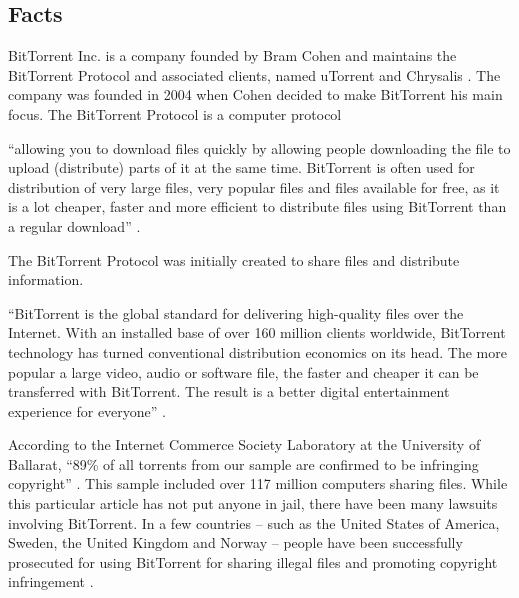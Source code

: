 \documentclass[11pt]{article}
\begin{document}
\begin{multicols}{2}

\setcounter{page}{1}


\section{Facts}
BitTorrent Inc. is a company founded by Bram Cohen and maintains the BitTorrent Protocol and associated clients, named uTorrent and Chrysalis \cite{btabout}. The company was founded in 2004 when Cohen decided to make BitTorrent his main focus. The BitTorrent Protocol is a computer protocol 

{\addtolength{\leftskip}{6mm}

``allowing you to download files quickly by allowing people downloading the file to upload (distribute) parts of it at the same time. BitTorrent is often used for distribution of very large files, very popular files and files available for free, as it is a lot cheaper, faster and more efficient to distribute files using BitTorrent than a regular download'' \cite{btabout}. 

}

The BitTorrent Protocol was initially created to share files and distribute information. 

{\addtolength{\leftskip}{6mm}

``BitTorrent is the global standard for delivering high-quality files over the Internet. With an installed base of over 160 million clients worldwide, BitTorrent technology has turned conventional distribution economics on its head. The more popular a large video, audio or software file, the faster and cheaper it can be transferred with BitTorrent. The result is a better digital entertainment experience for everyone'' \cite{btabout}.

}

According to the Internet Commerce Society Laboratory at the University of Ballarat, ``89\% of all torrents from our sample are confirmed to be infringing copyright'' \cite{ICSL}. This sample included over 117 million computers sharing files. While this particular article has not put anyone in jail, there have been many lawsuits involving BitTorrent. In a few countries -- such as the United States of America, Sweden, the United Kingdom and Norway -- people have been successfully prosecuted for using BitTorrent for sharing illegal files and promoting copyright infringement \cite{tpbverdict}.


\end{multicols}
\end{document}
